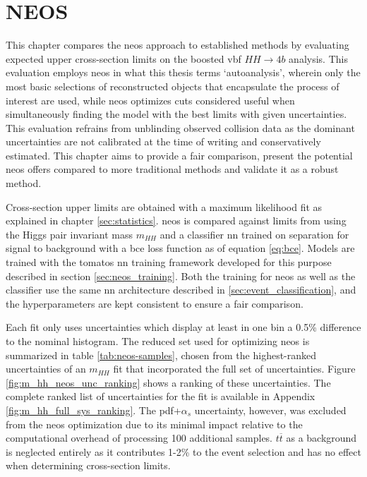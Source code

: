 \chapter{NEOS}
This chapter compares the \ac{neos} approach to established methods by evaluating expected upper cross-section limits on the boosted \ac{vbf} $HH\rightarrow4b$ analysis. This evaluation employs \ac{neos} in what this thesis terms `autoanalysis', wherein only the most basic selections of reconstructed objects that encapsulate the process of interest are used, while \ac{neos} optimizes cuts considered useful when simultaneously finding the model with the best limits with given uncertainties. This evaluation refrains from unblinding observed collision data as the dominant uncertainties are not calibrated at the time of writing and conservatively estimated. This chapter aims to provide a fair comparison, present the potential \ac{neos} offers compared to more traditional methods and validate it as a robust method. 

Cross-section upper limits are obtained with a maximum likelihood fit as explained in chapter \ref{sec:statistics}. \ac{neos} is compared against limits from using the Higgs pair invariant mass $m_{HH}$ and a classifier \ac{nn} trained on separation for signal to background with a \ac{bce} loss function as of equation \ref{eq:bce}. Models are trained with the \ac{tomatos} \ac{nn} training framework developed for this purpose \citep{tomatos} described in section \ref{sec:neos_training}. Both the training for \ac{neos} as well as the classifier use the same \ac{nn} architecture described in \ref{sec:event_classification}, and the hyperparameters are kept consistent to ensure a fair comparison.

Each fit only uses uncertainties which display at least in one bin a 0.5\% difference to the nominal histogram. The reduced set used for optimizing \ac{neos} is summarized in table \ref{tab:neos-samples}, chosen from the highest-ranked uncertainties of an $m_{HH}$ fit that incorporated the full set of uncertainties. Figure \ref{fig:m_hh_neos_unc_ranking} shows a ranking of these uncertainties. The complete ranked list of uncertainties for the \mhh fit is available in Appendix \ref{fig:m_hh_full_sys_ranking}. The \ac{pdf}+$\alpha_s$ uncertainty, however, was excluded from the \ac{neos} optimization due to its minimal impact relative to the computational overhead of processing 100 additional samples. $t\overline{t}$ as a background is neglected entirely as it contributes 1-2\% to the event selection and has no effect when determining cross-section limits.

